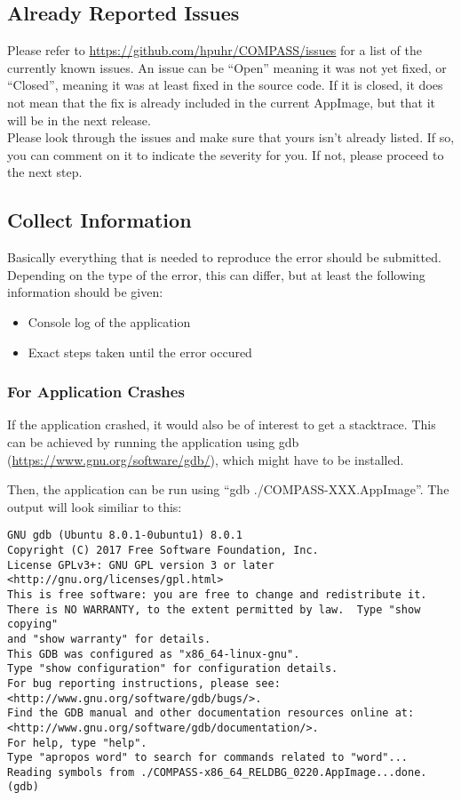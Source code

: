 \subsection{Already Reported Issues}

Please refer to \url{https://github.com/hpuhr/COMPASS/issues} for a list of the currently known issues. An issue can be ``Open'' meaning it was not yet fixed, or ``Closed'', meaning it was at least fixed in the source code. If it is closed, it does not mean that the fix is already included in the current AppImage, but that it will be in the next release. \\

Please look through the issues and make sure that yours isn't already listed. If so, you can comment on it to indicate the severity for you. If not, please proceed to the next step.

\subsection{Collect Information}

Basically everything that is needed to reproduce the error should be submitted. Depending on the type of the error, this can differ, but at least the following information should be given:

\begin{itemize}  
\item Console log of the application
\item Exact steps taken until the error occured
\end{itemize} 

\subsubsection{For Application Crashes}

If the application crashed, it would also be of interest to get a stacktrace. This can be achieved by running the application using gdb (\url{https://www.gnu.org/software/gdb/}), which might have to be installed.

Then, the application can be run using ``gdb ./COMPASS-XXX.AppImage''. The output will look similiar to this:

\begin{verbatim}
GNU gdb (Ubuntu 8.0.1-0ubuntu1) 8.0.1
Copyright (C) 2017 Free Software Foundation, Inc.
License GPLv3+: GNU GPL version 3 or later <http://gnu.org/licenses/gpl.html>
This is free software: you are free to change and redistribute it.
There is NO WARRANTY, to the extent permitted by law.  Type "show copying"
and "show warranty" for details.
This GDB was configured as "x86_64-linux-gnu".
Type "show configuration" for configuration details.
For bug reporting instructions, please see:
<http://www.gnu.org/software/gdb/bugs/>.
Find the GDB manual and other documentation resources online at:
<http://www.gnu.org/software/gdb/documentation/>.
For help, type "help".
Type "apropos word" to search for commands related to "word"...
Reading symbols from ./COMPASS-x86_64_RELDBG_0220.AppImage...done.
(gdb) 
\end{verbatim}



